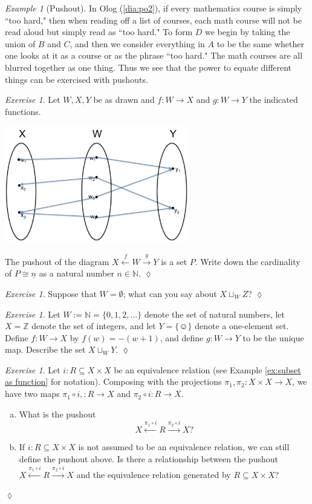 \documentclass{book}
\def\ZZ{{\mathbb Z}}
\def\NN{{\mathbb N}}
\def\singleton{\{\smiley\}}
\def\to{\rightarrow}
\def\taking{\colon}
\def\ss{\subseteq}
\def\iso{\cong}
\def\ul{\underline}
\newcommand{\To}[1]{\xrightarrow{#1}}
\newcommand{\Too}[1]{\xrightarrow{\ \ #1\ \ }}
\newcommand{\From}[1]{\xleftarrow{#1}}
\newcommand{\Fromm}[1]{\xleftarrow{\ \ #1\ \ }}
\theoremstyle{remark}
\newtheorem{example}[subsubsection]{Example}
\newtheorem{exc}[subsubsection]{Exercise}
\newenvironment{exercise}{\begin{exc}}{\hspace*{\fill}$\lozenge$\end{exc}}
\theoremstyle{definition}
\def\sexc{\begin{enumerate}[a.)]\setlength{\itemsep}{.1cm}\setlength{\parskip}{.1cm}\item}
\def\next{\item}
\def\endsexc{\end{enumerate}}
\begin{document}
\begin{example}[Pushout]
In Olog (\ref{dia:po2}), if every mathematics course is simply ``too hard," then when reading off a list of courses, each math course will not be read aloud but simply read as ``too hard."  To form $D$ we begin by taking the union of $B$ and $C$, and then we consider everything in $A$ to be the same whether one looks at it as a course or as the phrase ``too hard."  The math courses are all blurred together as one thing.  Thus we see that the power to equate different things can be exercised with pushouts.

\end{example}

\begin{exercise}
Let $W,X,Y$ be as drawn and $f\taking W\to X$ and $g\taking W\to Y$ the indicated functions. 
\begin{center}
\includegraphics[height=2in]{setPushout}
\end{center}
The pushout of the diagram $X\Fromm{f}W\Too{g}Y$ is a set $P$. Write down the cardinality of $P\iso\ul{n}$ as a natural number $n\in\NN$.  
\end{exercise}

\begin{exercise}
Suppose that $W=\emptyset$; what can you say about $X\sqcup_WZ$? 
\end{exercise}

\begin{exercise}
Let $W:=\NN=\{0,1,2,\ldots\}$ denote the set of natural numbers, let $X=\ZZ$ denote the set of integers, and let $Y=\singleton$ denote a one-element set. Define $f\taking W\to X$ by $f(w)= -(w+1)$, and define $g\taking W\to Y$ to be the unique map. Describe the set $X\sqcup_WY$.
\end{exercise}

\begin{exercise}
Let $i\taking R\ss X\times X$ be an equivalence relation (see Example \ref{ex:subset as function} for notation). Composing with the projections $\pi_1,\pi_2\taking X\times X\to X$, we have two maps $\pi_1\circ i,\taking R\to X$ and $\pi_2\circ i\taking R\to X$. 
\sexc What is the pushout $$X\From{\pi_1\circ i}R\To{\pi_2\circ i}X?$$ 
\next If $i\taking R\ss X\times X$ is not assumed to be an equivalence relation, we can still define the pushout above. Is there a relationship between the pushout $X\From{\pi_1\circ i}R\To{\pi_2\circ i}X$ and the equivalence relation generated by $R\ss X\times X$?
\endsexc
\end{exercise}
\end{document}
